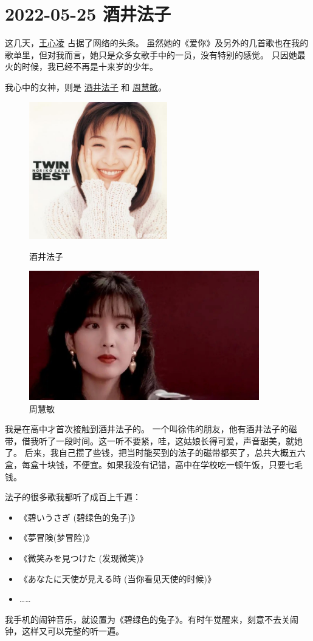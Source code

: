\section{2022-05-25 酒井法子}

这几天，\href{https://www.weibo.com/u/1504965390}{王心凌} 占据了网络的头条。
虽然她的《爱你》及另外的几首歌也在我的歌单里，但对我而言，她只是众多女歌手中的一员，没有特别的感觉。
只因她最火的时候，我已经不再是十来岁的少年。

我心中的女神，则是 \href{https://baike.baidu.com/item/酒井法子/265809}{酒井法子} 和 \href{https://baike.baidu.com/item/周慧敏/6702}{周慧敏}。

\begin{figure}[htbp]
    \centering
    \begin{minipage}{6cm}
        \centering
        \includegraphics[width=6cm]{pic/酒井法子.jpg}
        \caption*{酒井法子}
    \end{minipage}
    \quad
    \begin{minipage}{10cm}
        \centering
        \includegraphics[width=10cm]{pic/周慧敏.jpg}
        \caption*{周慧敏}
    \end{minipage}
\end{figure}

我是在高中才首次接触到酒井法子的。
一个叫徐伟的朋友，他有酒井法子的磁带，借我听了一段时间。这一听不要紧，哇，这姑娘长得可爱，声音甜美，就她了。
后来，我自己攒了些钱，把当时能买到的法子的磁带都买了，总共大概五六盒，每盒十块钱，不便宜。如果我没有记错，高中在学校吃一顿午饭，只要七毛钱。

法子的很多歌我都听了成百上千遍：

\begin{itemize}[nosep, left=\parindent]
    \item 《碧いうさぎ (碧绿色的兔子)》
    \item 《夢冒険(梦冒险)》
    \item 《微笑みを見つけた (发现微笑)》
    \item 《あなたに天使が見える時 (当你看见天使的时候)》
    \item ……
\end{itemize}

我手机的闹钟音乐，就设置为《碧绿色的兔子》。有时午觉醒来，刻意不去关闹钟，这样又可以完整的听一遍。

